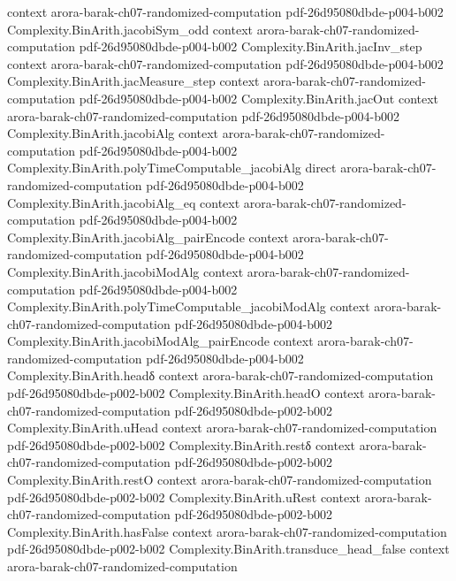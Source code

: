 \begin{theorem}
  {context}
  {arora-barak-ch07-randomized-computation}
  {pdf-26d95080dbde-p004-b002}
\proofstep
  {Complexity.BinArith.jacobiSym_odd}
  {context}
  {arora-barak-ch07-randomized-computation}
  {pdf-26d95080dbde-p004-b002}
\proofstep
  {Complexity.BinArith.jacInv_step}
  {context}
  {arora-barak-ch07-randomized-computation}
  {pdf-26d95080dbde-p004-b002}
\proofstep
  {Complexity.BinArith.jacMeasure_step}
  {context}
  {arora-barak-ch07-randomized-computation}
  {pdf-26d95080dbde-p004-b002}
\proofstep
  {Complexity.BinArith.jacOut}
  {context}
  {arora-barak-ch07-randomized-computation}
  {pdf-26d95080dbde-p004-b002}
\proofstep
  {Complexity.BinArith.jacobiAlg}
  {context}
  {arora-barak-ch07-randomized-computation}
  {pdf-26d95080dbde-p004-b002}
\proofstep
  {Complexity.BinArith.polyTimeComputable_jacobiAlg}
  {direct}
  {arora-barak-ch07-randomized-computation}
  {pdf-26d95080dbde-p004-b002}
\proofstep
  {Complexity.BinArith.jacobiAlg_eq}
  {context}
  {arora-barak-ch07-randomized-computation}
  {pdf-26d95080dbde-p004-b002}
\proofstep
  {Complexity.BinArith.jacobiAlg_pairEncode}
  {context}
  {arora-barak-ch07-randomized-computation}
  {pdf-26d95080dbde-p004-b002}
\proofstep
  {Complexity.BinArith.jacobiModAlg}
  {context}
  {arora-barak-ch07-randomized-computation}
  {pdf-26d95080dbde-p004-b002}
\proofstep
  {Complexity.BinArith.polyTimeComputable_jacobiModAlg}
  {context}
  {arora-barak-ch07-randomized-computation}
  {pdf-26d95080dbde-p004-b002}
\proofstep
  {Complexity.BinArith.jacobiModAlg_pairEncode}
  {context}
  {arora-barak-ch07-randomized-computation}
  {pdf-26d95080dbde-p004-b002}
\proofstep
  {Complexity.BinArith.headδ}
  {context}
  {arora-barak-ch07-randomized-computation}
  {pdf-26d95080dbde-p002-b002}
\proofstep
  {Complexity.BinArith.headO}
  {context}
  {arora-barak-ch07-randomized-computation}
  {pdf-26d95080dbde-p002-b002}
\proofstep
  {Complexity.BinArith.uHead}
  {context}
  {arora-barak-ch07-randomized-computation}
  {pdf-26d95080dbde-p002-b002}
\proofstep
  {Complexity.BinArith.restδ}
  {context}
  {arora-barak-ch07-randomized-computation}
  {pdf-26d95080dbde-p002-b002}
\proofstep
  {Complexity.BinArith.restO}
  {context}
  {arora-barak-ch07-randomized-computation}
  {pdf-26d95080dbde-p002-b002}
\proofstep
  {Complexity.BinArith.uRest}
  {context}
  {arora-barak-ch07-randomized-computation}
  {pdf-26d95080dbde-p002-b002}
\proofstep
  {Complexity.BinArith.hasFalse}
  {context}
  {arora-barak-ch07-randomized-computation}
  {pdf-26d95080dbde-p002-b002}
\proofstep
  {Complexity.BinArith.transduce_head_false}
  {context}
  {arora-barak-ch07-randomized-computation}

\end{theorem}

